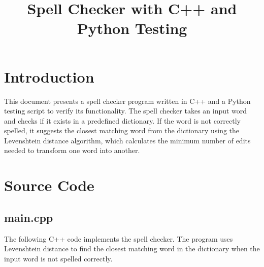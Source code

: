 \documentclass{article}
\title{Spell Checker with C++ and Python Testing}
\author{}
\date{}
\begin{document}
\maketitle

\section*{Introduction}
This document presents a spell checker program written in C++ and a Python testing script to verify its functionality. The spell checker takes an input word and checks if it exists in a predefined dictionary. If the word is not correctly spelled, it suggests the closest matching word from the dictionary using the Levenshtein distance algorithm, which calculates the minimum number of edits needed to transform one word into another.

\section*{Source Code}

\subsection*{main.cpp}
The following C++ code implements the spell checker. The program uses Levenshtein distance to find the closest matching word in the dictionary when the input word is not spelled correctly.
\end{document}
